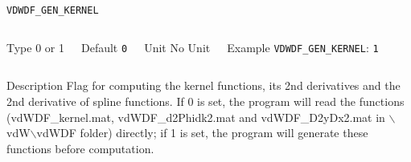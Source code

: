 \documentclass[xcolor=dvipsnames,t]{beamer}
\begin{document}
\begin{frame}[allowframebreaks]{\texttt{VDWDF\_GEN\_KERNEL}} \label{VDWDF_GEN_KERNEL}
\vspace*{-12pt}
\begin{columns}
\begin{block}{Type}
0 or 1
\end{block}

\begin{block}{Default}
\texttt{0}
\end{block}

\begin{block}{Unit}
No Unit
\end{block}

\begin{block}{Example}
\texttt{VDWDF\_GEN\_KERNEL}: \texttt{1}
\end{block}
\end{columns}

\begin{block}{Description}
Flag for computing the kernel functions, its 2nd derivatives and the 2nd derivative of spline functions. If 0 is set, the program will read the functions (vdWDF\_kernel.mat, vdWDF\_d2Phidk2.mat and vdWDF\_D2yDx2.mat in $\backslash$vdW$\backslash$vdWDF folder) directly; if 1 is set, the program will generate these functions before computation.
\end{block}
\end{frame}
\end{document}
